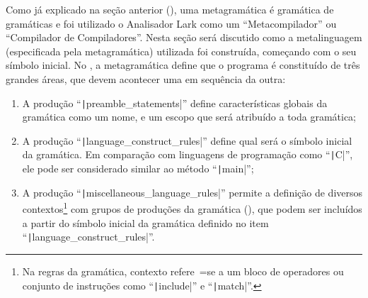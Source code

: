 Como já explicado na seção anterior (),
uma metagramática é gramática de gramáticas e
foi utilizado o Analisador Lark como um ``Metacompilador'' ou
``Compilador de Compiladores''.
Nesta seção será discutido como a metalinguagem (especificada pela metagramática) utilizada foi construída,
começando com o seu símbolo inicial.
No ,
a metagramática define que o programa é constituído de três grandes áreas,
que devem acontecer uma em sequência da outra:
\begin{enumerate}
\item A produção ``\texttt|preamble_statements|'' define características globais da gramática como um nome,
e um escopo que será atribuído a toda gramática;
\item A produção ``\texttt|language_construct_rules|'' define qual será o símbolo inicial da gramática.
Em comparação com linguagens de programação como ``\texttt|C|'',
ele pode ser considerado similar ao método ``\texttt|main|'';
\item A produção ``\texttt|miscellaneous_language_rules|'' permite a definição de diversos contextos\footnote{
Na regras da gramática,
contexto refere~=se a um bloco de operadores ou
conjunto de instruções como ``\texttt|include|'' e
``\texttt|match|''.
} com grupos de produções da gramática (),
que podem ser incluídos a partir do símbolo inicial da gramática definido no item ``\texttt|language_construct_rules|''.
\end{enumerate}%
